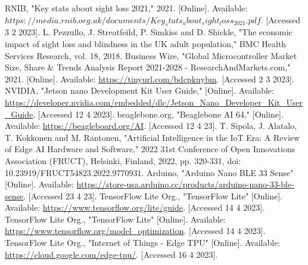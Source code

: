 \documentclass[conference]{IEEEtran}
\begin{document}
\begin{thebibliography}{00}
 RNIB, "Key stats about sight loss 2021," 2021. [Online]. Available: $https://media.rnib.org.uk/documents/Key_stats_about_sight_loss_2021.pdf.$ [Accessed 3 2 2023].
 L. Pezzullo, J. Streatfeild, P. Simkiss and D. Shickle, "The economic impact of sight loss and blindness in the UK adult population," BMC Health Services Research, vol. 18, 2018. 
 Business Wire, "Global Microcontroller Market Size, Share \& Trends Analysis Report 2021-2028 - ResearchAndMarkets.com," 2021. [Online]. Available: \url{https://tinyurl.com/bdcpkuybm}. [Accessed 2 3 2023].
  NVIDIA, "Jetson nano Development Kit User Guide," [Online]. Available: \url{https://developer.nvidia.com/embedded/dlc/Jetson_Nano_Developer_Kit_User_Guide}. [Accessed 12 4 2023].
 beaglebone.org, "Beaglebone AI 64," [Online]. Available: \url{https://beagleboard.org/AI}. [Accessed 12 4 23].
 T. Sipola, J. Alatalo, T. Kokkonen and M. Rantonen, "Artificial Intelligence in the IoT Era: A Review of Edge AI Hardware and Software," 2022 31st Conference of Open Innovations Association (FRUCT), Helsinki, Finland, 2022, pp. 320-331, doi: 10.23919/FRUCT54823.2022.9770931.
 Arduino, "Arduino Nano BLE 33 Sense" [Online]. Available: \url{https://store-usa.arduino.cc/products/arduino-nano-33-ble-sense}. [Accessed 23 4 23].
 TensorFlow Lite Org., "TensorFlow Lite" [Online]. Available: \url{https://www.tensorflow.org/lite/guide}. [Accessed 14 4 2023].
 TensorFlow Lite Org., "TensorFlow Lite" [Online]. Available: \url{https://www.tensorflow.org/model_optimization}. [Accessed 14 4 2023].
 TensorFlow Lite Org., "Internet of Things - Edge TPU" [Online]. Available: \url{https://cloud.google.com/edge-tpu/}. [Accessed 16 4 2023].

\end{thebibliography}
\end{document}
